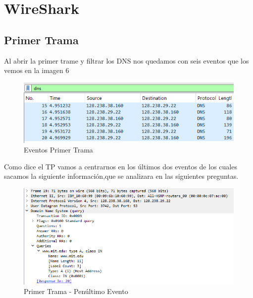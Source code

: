 \documentclass{article}
\begin{document}
\newpage

\section{WireShark}

\subsection{Primer Trama}

Al abrir la primer trame y filtrar los DNS nos quedamos con seis eventos que los vemos en la imagen 6

\begin{figure}[h]
    \centering
    \includegraphics[width=1\linewidth]{Fotos/PrimerTramaEventos.png}
    \caption{Eventos Primer Trama}
\end{figure}

Como dice el TP vamos a centrarnos en los últimos dos eventos de los cuales sacamos la siguiente información,que se analizara en las siguientes preguntas.

\begin{figure}
    \centering
    \includegraphics[width=1\linewidth]{Fotos/PrimerTramaPrimerEvento.png}
    \caption{Primer Trama - Penúltimo Evento}
\end{figure}
\end{document}
